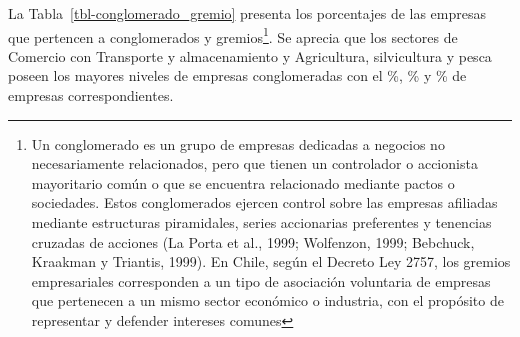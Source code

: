 \documentclass[
  11pt,
]{article}
\begin{document}
\begin{table}

\caption{\label{tbl-subcontratos_region}Distribución regional de
Empresas que operan mediante Subcontratación}


\end{table}%

La Tabla~\ref{tbl-conglomerado_gremio} presenta los porcentajes de las
empresas que pertencen a conglomerados y gremios\footnote{Un
  conglomerado es un grupo de empresas dedicadas a negocios no
  necesariamente relacionados, pero que tienen un controlador o
  accionista mayoritario común o que se encuentra relacionado mediante
  pactos o sociedades. Estos conglomerados ejercen control sobre las
  empresas afiliadas mediante estructuras piramidales, series
  accionarias preferentes y tenencias cruzadas de acciones (La Porta et
  al., 1999; Wolfenzon, 1999; Bebchuck, Kraakman y Triantis, 1999). En
  Chile, según el Decreto Ley 2757, los gremios empresariales
  corresponden a un tipo de asociación voluntaria de empresas que
  pertenecen a un mismo sector económico o industria, con el propósito
  de representar y defender intereses comunes}. Se aprecia que los
sectores de Comercio con Transporte y almacenamiento y Agricultura,
silvicultura y pesca poseen los mayores niveles de empresas
conglomeradas con el \%, \% y \% de
empresas correspondientes.
\end{document}
